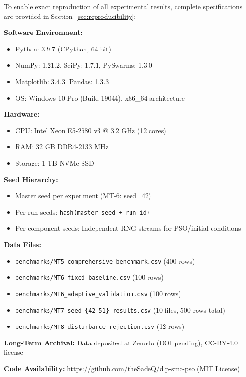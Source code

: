 To enable exact reproduction of all experimental results, complete specifications are provided in Section~\ref{sec:reproducibility}:

\textbf{Software Environment:}
\begin{itemize}
    \item Python: 3.9.7 (CPython, 64-bit)
    \item NumPy: 1.21.2, SciPy: 1.7.1, PySwarms: 1.3.0
    \item Matplotlib: 3.4.3, Pandas: 1.3.3
    \item OS: Windows 10 Pro (Build 19044), x86\_64 architecture
\end{itemize}

\textbf{Hardware:}
\begin{itemize}
    \item CPU: Intel Xeon E5-2680 v3 @ 3.2 GHz (12 cores)
    \item RAM: 32 GB DDR4-2133 MHz
    \item Storage: 1 TB NVMe SSD
\end{itemize}

\textbf{Seed Hierarchy:}
\begin{itemize}
    \item Master seed per experiment (MT-6: seed=42)
    \item Per-run seeds: \texttt{hash(master\_seed + run\_id)}
    \item Per-component seeds: Independent RNG streams for PSO/initial conditions
\end{itemize}

\textbf{Data Files:}
\begin{itemize}
    \item \texttt{benchmarks/MT5\_comprehensive\_benchmark.csv} (400 rows)
    \item \texttt{benchmarks/MT6\_fixed\_baseline.csv} (100 rows)
    \item \texttt{benchmarks/MT6\_adaptive\_validation.csv} (100 rows)
    \item \texttt{benchmarks/MT7\_seed\_\{42-51\}\_results.csv} (10 files, 500 rows total)
    \item \texttt{benchmarks/MT8\_disturbance\_rejection.csv} (12 rows)
\end{itemize}

\textbf{Long-Term Archival:} Data deposited at Zenodo (DOI pending), CC-BY-4.0 license

\textbf{Code Availability:} \url{https://github.com/theSadeQ/dip-smc-pso} (MIT License)

